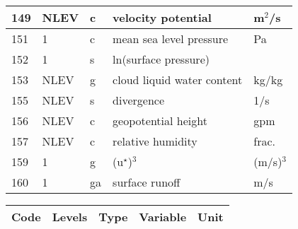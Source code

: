 \begin{center}
\begin{tabular}[t]{|l|l|l|l|l|}
149 & NLEV & c  & velocity potential               & m$^{2}$/s       \\ \hline
151 & 1    & c  & mean sea level pressure          & Pa              \\ \hline
152 & 1    & s  & ln(surface pressure)             &                 \\ \hline
153 & NLEV & g  & cloud liquid water content       & kg/kg           \\ \hline
155 & NLEV & s  & divergence                       & 1/s             \\ \hline
156 & NLEV & c  & geopotential height              & gpm             \\ \hline
157 & NLEV & c  & relative humidity                & frac.           \\ \hline
159 & 1    & g  & (u$^{\star}$)$^{3}$              & (m/s)$^{3}$     \\ \hline
160 & 1    & ga & surface runoff                   & m/s             \\ \hline
\end{tabular}

\newpage

\begin{tabular}[t]{|l|l|l|l|l|} \hline
\multicolumn{1}{|c|}{Code} &
\multicolumn{1}{c|}{Levels}&
\multicolumn{1}{c|}{Type} &
\multicolumn{1}{c|}{Variable} &
\multicolumn{1}{c|}{Unit} \\ \hline \hline


\end{tabular}
\end{center}
